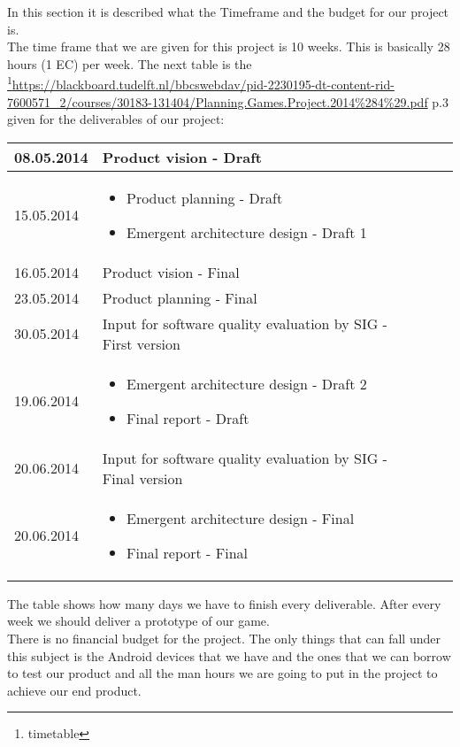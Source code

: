 In this section it is described what the Timeframe and the budget for our project is. \\
The time frame that we are given for this project is 10 weeks. This is basically 28 hours (1 EC) per week. 
The next table is the \footnote{timetable}{\url{https://blackboard.tudelft.nl/bbcswebdav/pid-2230195-dt-content-rid-7600571_2/courses/30183-131404/Planning.Games.Project.2014%284%29.pdf} p.3} given for the deliverables of our project:
\begin{center}
	\begin{tabular}{ p{5cm} l | p{10cm}  l }
		\hline
	 	08.05.2014 & Product vision - Draft \\ \hline
		15.05.2014 & 
		\begin{itemize}
			\item Product planning - Draft
			\item Emergent architecture design - Draft 1
		\end{itemize} \\ \hline
		16.05.2014 & Product vision - Final \\ \hline
		23.05.2014 & Product planning - Final \\ \hline
		30.05.2014 & Input for software quality evaluation by SIG - First version \\ \hline
		19.06.2014 &
		\begin{itemize}
			\item Emergent architecture design - Draft 2
			\item Final report - Draft
		\end{itemize} \\ \hline
		20.06.2014 & Input for software quality evaluation by SIG - Final version \\ \hline
		20.06.2014 &
		\begin{itemize}
			\item Emergent architecture design - Final
			\item Final report - Final
		\end{itemize} \\
		\hline
	\end{tabular}
\end{center}
The table shows how many days we have to finish every deliverable. After every week we should deliver a prototype of our game. \\
\newline
There is no financial budget for the project. The only things that can fall under this subject is the Android devices that we have and the ones that we can borrow to test our product and all the man hours we are going to put in the project to achieve our end product.